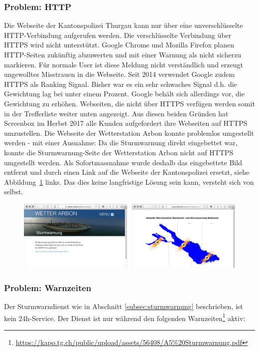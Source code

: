 \subsubsection*{Problem: HTTP}
Die Webseite der Kantonspolizei Thurgau kann nur über eine unverschlüsselte HTTP-Verbindung aufgerufen werden. Die verschlüsselte Verbindung über HTTPS wird nicht unterstützt. Google Chrome und Mozilla Firefox planen HTTP-Seiten zukünftig abzuwerten und mit einer Warnung als \flqq nicht sicher\frqq zu markieren\cite{Chromium:marking-http-as-non-secure}\cite{Mozilla:DeprecatingNon-SecureHTTP}. Für normale User ist diese Meldung nicht verständlich und erzeugt ungewolltes Misstrauen in die Webseite. 
Seit 2014 verwendet Google zudem HTTPS als Ranking Signal. Bisher war es ein sehr schwaches Signal d.h. die Gewichtung lag bei unter einem Prozent. Google behält sich allerdings vor, die Gewichtung zu erhöhen\cite{Googleblog:https-as-ranking-signal}. Webseiten, die nicht über HTTPS verfügen werden somit in der Trefferliste weiter unten angezeigt. 
Aus diesen beiden Gründen hat Screenbox im Herbst 2017 alle Kunden aufgefordert ihre Webseiten auf HTTPS umzustellen. Die Webseite der Wetterstation Arbon konnte problemlos umgestellt werden - mit einer Ausnahme: Da die Sturmwarnung direkt eingebettet war, konnte die Sturmwarnung-Seite der Wetterstation Arbon nicht auf HTTPS umgestellt werden. Als Sofortmassnahme wurde deshalb das eingebettete Bild entfernt und durch einen Link auf die Webseite der Kantonspolizei ersetzt, siehe Abbildung~\ref{img:sturm} links. Das dies keine langfristige Lösung sein kann, versteht sich von selbst.

\begin{figure}[h!]
	\centering
	\includegraphics[width=1\linewidth]{img/sturm}
	\caption{}
	\label{img:sturm}
\end{figure}

\subsubsection*{Problem: Warnzeiten}
Der Sturmwarndienst wie in Abschnitt \ref{subsec:sturmwarnung} beschrieben, ist kein 24h-Service. Der Dienst ist nur während den folgenden Warnzeiten\footnote{ \url{https://kapo.tg.ch/public/upload/assets/56408/A5\%20Sturmwarnung.pdf}} aktiv:

